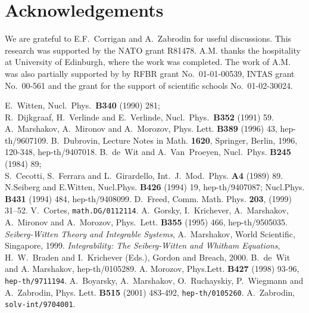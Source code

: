 \documentclass[a4paper,]{article}
\begin{document}
\section*{Acknowledgements}

We are grateful to E.F.~Corrigan and A.~Zabrodin for useful discussions.
This research was supported by the NATO grant R81478. A.M. thanks the
hospitality at University of Edinburgh, where the work was completed.
The work of A.M. was also partially supported by by RFBR grant
No.~01-01-00539, INTAS grant No.~00-561
and the grant for the support of scientific schools
No.~01-02-30024.


\begin{thebibliography}{22}
%
E.~Witten, Nucl.\ Phys.\ {\bf B340} (1990) 281;\\
R.~Dijkgraaf, H.~Verlinde and E.~Verlinde,
Nucl.\ Phys.\ {\bf B352} (1991) 59.
%
A.~Marshakov, A.~Mironov and A.~Morozov,
Phys. Lett. {\bf B389} (1996) 43, hep-th/9607109.
%
 B.~Dubrovin, Lecture Notes in Math. {\bf 1620},
Springer, Berlin, 1996, 120-348, hep-th/9407018.
%
B.~de~Wit and A.~Van~Proeyen, Nucl.~Phys. {\bf B245} (1984) 89;\\
S.~Cecotti, S.~Ferrara and L.~Girardello, Int.~J.~Mod.~Phys. {\bf A4}
(1989) 89.
%
N.Seiberg and E.Witten, Nucl.Phys. {\bf B426} (1994) 19,
hep-th/9407087; Nucl.Phys. {\bf B431} (1994) 484,
hep-th/9408099.
%
 D.~Freed,
Comm. Math. Phys. {\bf 203}, (1999) 31--52.
%
V.~Cortes,
{\tt math.DG/0112114}.
%
A.~Gorsky, I.~Krichever, A.~Marshakov, A.~Mironov and A.~Morozov,
Phys.~Lett. {\bf B355} (1995) 466, hep-th/9505035.
%
 {\sl Seiberg-Witten Theory and Integrable Systems},
A.~Marshakov, World Scientific, Singapore, 1999.
%
 {\sl Integrability: The Seiberg-Witten and Whitham Equations},
H.~W.~Braden and I.~Krichever (Eds.),
Gordon and Breach, 2000.
%
B.~de~Wit and A. Marshakov, hep-th/0105289.
%
A. Morozov, 
Phys.Lett. {\bf B427} (1998) 93-96,
{\tt hep-th/9711194}.
%
A.~Boyarsky, A.~Marshakov, O.~Ruchayskiy, P.~Wiegmann
and A.~Zabrodin, Phys. Lett. {\bf B515} (2001) 483-492, {\tt hep-th/0105260}.
%
A.~Zabrodin, 
{\tt solv-int/9704001}.

\end{thebibliography}
\end{document}
